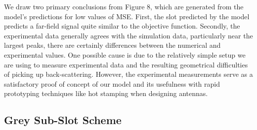 \documentclass[11pt]{article}
\begin{document}
\noindent We draw two primary conclusions from Figure 8, which are generated from the model's predictions for low values of MSE. First, the slot predicted by the model predicts a far-field signal quite similar to the objective function. Secondly, the experimental data generally agrees with the simulation data, particularly near the largest peaks, there are certainly differences between the numerical and experimental values. One possible cause is due to the relatively simple setup we are using to measure experimental data and the resulting geometrical difficulties of picking up back-scattering. However, the experimental measurements serve as a satisfactory proof of concept of our model and its usefulness with rapid prototyping techniques like hot stamping when designing antennas. 

\subsection*{Grey Sub-Slot Scheme}
%
%
%
\end{document}
